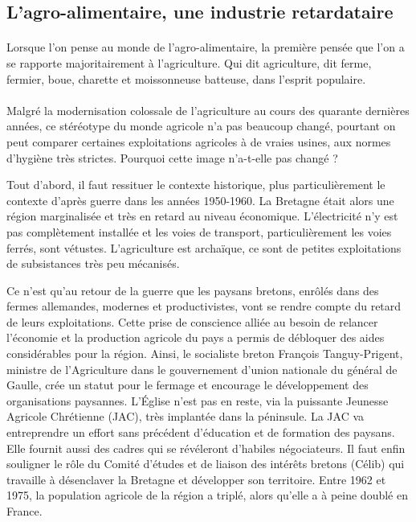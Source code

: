 \documentclass[a4paper,12pt]{report}
\begin{document}
		\subsection{L'agro-alimentaire, une industrie retardataire}
			\paragraph{}Lorsque l’on pense au monde de l’agro-alimentaire, la première pensée que l’on a se rapporte majoritairement à l’agriculture. Qui dit agriculture, dit ferme, fermier, boue, charette et moissonneuse batteuse, dans l’esprit populaire.
			
			\paragraph{}Malgré la modernisation colossale de l’agriculture au cours des quarante dernières années, ce stéréotype du monde agricole n’a pas beaucoup changé, pourtant on peut comparer certaines exploitations agricoles à de vraies usines, aux normes d’hygiène très strictes. Pourquoi cette image n’a-t-elle pas changé ?
			
			Tout d’abord, il faut ressituer le contexte historique, plus particulièrement le contexte d’après guerre dans les années 1950-1960. La Bretagne était alors une région marginalisée et très en retard au niveau économique. L’électricité n’y est pas complètement installée et les voies de transport, particulièrement les voies ferrés, sont vétustes. L’agriculture est archaïque, ce sont de petites exploitations de subsistances très peu mécanisés.
			
			Ce n’est qu’au retour de la guerre que les paysans bretons, enrôlés dans des fermes allemandes, modernes et productivistes, vont se rendre compte du retard de leurs exploitations. Cette prise de conscience alliée au besoin de relancer l’économie et la production agricole du pays a permis de débloquer des aides considérables pour la région. Ainsi, le socialiste breton François Tanguy-Prigent, ministre de l'Agriculture dans le gouvernement d'union nationale du général de Gaulle, crée un statut pour le fermage et encourage le développement des organisations paysannes. L'Église n'est pas en reste, via la puissante Jeunesse Agricole Chrétienne (JAC), très implantée dans la péninsule. La JAC va entreprendre un effort sans précédent d'éducation et de formation des paysans. Elle fournit aussi des cadres qui se révéleront d'habiles négociateurs. Il faut enfin souligner le rôle du Comité d'études et de liaison des intérêts bretons (Célib) qui travaille à désenclaver la Bretagne et développer son territoire\cite{ModernisationAgricultureBretonne}. Entre 1962 et 1975, la population agricole de la région a triplé, alors qu’elle a à peine doublé en France.
			
\end{document}
